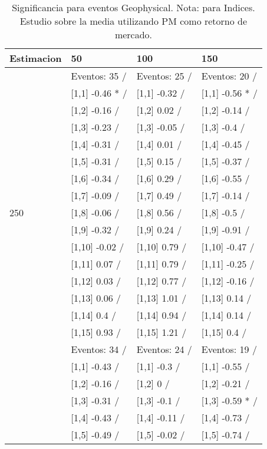 \begin{table}

\caption{Significancia para eventos Geophysical. Nota: para Indices. Estudio sobre la media utilizando PM como retorno de mercado.}
\centering
\begin{tabular}[t]{llll}
\toprule
Estimacion & 50 & 100 & 150\\
\midrule
 & Eventos:  35 / & Eventos:  25 / & Eventos:  20 /\\
 & {}[1,1] -0.46 * / & {}[1,1] -0.32  / & {}[1,1] -0.56 * /\\
 & {}[1,2] -0.16  / & {}[1,2] 0.02  / & {}[1,2] -0.14  /\\
 & {}[1,3] -0.23  / & {}[1,3] -0.05  / & {}[1,3] -0.4  /\\
 & {}[1,4] -0.31  / & {}[1,4] 0.01  / & {}[1,4] -0.45  /\\
\addlinespace
 & {}[1,5] -0.31  / & {}[1,5] 0.15  / & {}[1,5] -0.37  /\\
 & {}[1,6] -0.34  / & {}[1,6] 0.29  / & {}[1,6] -0.55  /\\
 & {}[1,7] -0.09  / & {}[1,7] 0.49  / & {}[1,7] -0.14  /\\
250 & {}[1,8] -0.06  / & {}[1,8] 0.56  / & {}[1,8] -0.5  /\\
 & {}[1,9] -0.32  / & {}[1,9] 0.24  / & {}[1,9] -0.91  /\\
\addlinespace
 & {}[1,10] -0.02  / & {}[1,10] 0.79  / & {}[1,10] -0.47  /\\
 & {}[1,11] 0.07  / & {}[1,11] 0.79  / & {}[1,11] -0.25  /\\
 & {}[1,12] 0.03  / & {}[1,12] 0.77  / & {}[1,12] -0.16  /\\
 & {}[1,13] 0.06  / & {}[1,13] 1.01  / & {}[1,13] 0.14  /\\
 & {}[1,14] 0.4  / & {}[1,14] 0.94  / & {}[1,14] 0.14  /\\
\addlinespace
 & {}[1,15] 0.93  / & {}[1,15] 1.21  / & {}[1,15] 0.4  /\\
 & Eventos:  34 / & Eventos:  24 / & Eventos:  19 /\\
 & {}[1,1] -0.43  / & {}[1,1] -0.3  / & {}[1,1] -0.55  /\\
 & {}[1,2] -0.16  / & {}[1,2] 0  / & {}[1,2] -0.21  /\\
 & {}[1,3] -0.31  / & {}[1,3] -0.1  / & {}[1,3] -0.59 * /\\
\addlinespace
 & {}[1,4] -0.43  / & {}[1,4] -0.11  / & {}[1,4] -0.73  /\\
 & {}[1,5] -0.49  / & {}[1,5] -0.02  / & {}[1,5] -0.74  /\\

\end{tabular}
\end{table}
